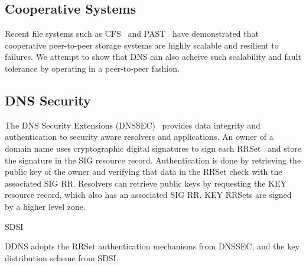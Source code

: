 \subsection{Cooperative Systems}

Recent file systems such as CFS~\cite{cfs:sosp01} and 
PAST~\cite{past:sosp} have demonstrated that cooperative 
peer-to-peer storage systems 
are highly scalable and resilient to failures. We attempt
to show that DNS can also acheive such scalability 
and fault tolerance by operating in a peer-to-peer fashion.


\subsection{DNS Security}

The DNS Security Extensions (DNSSEC)~\cite{dnssec:rfc} 
provides data integrity and authentication to security aware 
resolvers and applications. An owner of a domain name uses
cryptographic digital signatures to sign each RRSet~\cite{dns-cla:rfc}
and store the signature in the SIG resource record. 
Authentication is done by retrieving the public key of the
owner and verifying that data in the RRSet check with the 
associated SIG RR. Resolvers can retrieve public keys by 
requesting the KEY resource record, which also has an associated
SIG RR. KEY RRSets are signed by a higher level zone.

SDSI

DDNS adopts the RRSet authentication mechanisms from DNSSEC,
and the key distribution scheme from SDSI.

